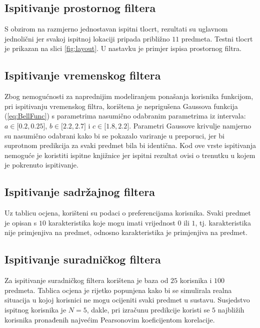 \documentclass[times, utf8, diplomski, numeric]{fer}
\begin{document}
\subsection{Ispitivanje prostornog filtera}
S obzirom na razmjerno jednostavan ispitni tlocrt, rezultati su uglavnom
jednolični jer svakoj ispitnoj lokaciji pripada približno $11$ predmeta. Testni
tlocrt je prikazan na slici \ref{fig:layout}. U nastavku je primjer ispisa
prostornog filtra.



\subsection{Ispitivanje vremenskog filtera}
Zbog nemogućnosti za naprednijim modeliranjem ponašanja korisnika funkcijom, pri
ispitivanju vremenskog filtra, korištena je neprigušena Gaussova funkcija
(\ref{eq:BellFunc}) s parametrima nasumično odabranim parametrima iz intervala:
$a \in \big[0.2, 0.25 \big]$, 
$b \in \big[2.2, 2.7 \big]$ i 
$c \in \big[1.8, 2.2 \big]$.
Parametri Gaussove krivulje namjerno su nasumično odabrani kako bi se pokazalo
variranje u preporuci, jer bi suprotnom predikcija za svaki predmet bila bi
identična. Kod ove vrste ispitivanja nemoguće je koristiti ispitne knjižnice
jer ispitni rezultat ovisi o trenutku u kojem je pokrenuto ispitivanje.



\subsection{Ispitivanje sadržajnog filtera}
Uz tablicu ocjena, korišteni su podaci o preferencijama korisnika. Svaki predmet
je opisan s $10$ karakteristika koje mogu imati vrijednost $0$ ili $1$, tj.
karakteristika nije primjenjiva na predmet, odnosno karakteristika je
primjenjiva na predmet.



\subsection{Ispitivanje suradničkog filtera}
Za ispitivanje suradničkog filtera korištena je baza od $25$ korisnika i $100$
predmeta. Tablica ocjena je rijetko popunjena kako bi se simulirala realna
situacija u kojoj korisnici ne mogu ocijeniti svaki predmet u sustavu.
Susjedstvo ispitnog korisnika je $N = 5$, dakle, pri izračunu predikcije koristi
se $5$ najbližih korisnika pronađenih najvećim Pearsonovim koeficijentom
korelacije.
\end{document}
